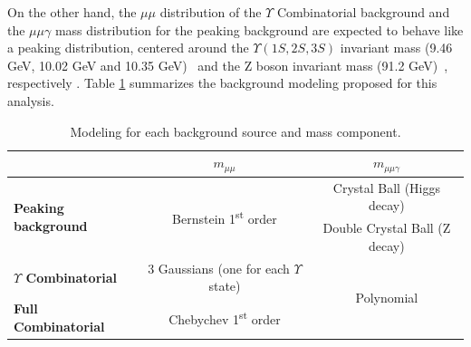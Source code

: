 On the other hand, the $\mu\mu$ distribution of the $\Upsilon$ Combinatorial background and the $\mu\mu\gamma$ mass distribution for the peaking background are expected to behave like a peaking distribution, centered around the $\Upsilon(1S, 2S, 3S)$ invariant mass (9.46 GeV, 10.02 GeV and 10.35 GeV)~\cite{Patrignani:2016xqp} and the Z boson invariant mass (91.2 GeV)~\cite{Patrignani:2016xqp}, respectively . Table \ref{tab:BckgModeling_Z} summarizes the background modeling proposed for this analysis.




\begin{table}[ht]
\begin{center}
\begin{tabular}{l|c|c}
                         & $m_{\mu\mu}$                                          & $m_{\mu\mu\gamma}$       \\ \hline 
\multirow{2}{*}{\textbf{Peaking background} }      & \multirow{2}{*}{Bernstein 1\textsuperscript{st} order}                 & Crystal Ball (Higgs decay)    \\ 
                                  &                       & Double Crystal Ball (Z decay)    \\ \hline
\textbf{$\Upsilon$ Combinatorial} & 3 Gaussians (one for each $\Upsilon$ state) & \multirow{2}{*}{Polynomial}  \\ \cline{1-2}
\textbf{Full Combinatorial}       & Chebychev 1\textsuperscript{st} order                 &                          \\ 
\end{tabular}

\caption{Modeling for each background source and mass component.}
\label{tab:BckgModeling_Z}
\end{center}
\end{table}


